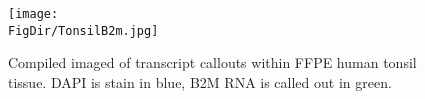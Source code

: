 \begin{figure}
  \caption{Compiled imaged of transcript callouts within FFPE human tonsil tissue. DAPI is stain in blue, B2M RNA is called out in green.}
   \centerline{\texttt{[image: \\FigDir/TonsilB2m.jpg]}}
\label{fig:TonsilB2m}
\end{figure}